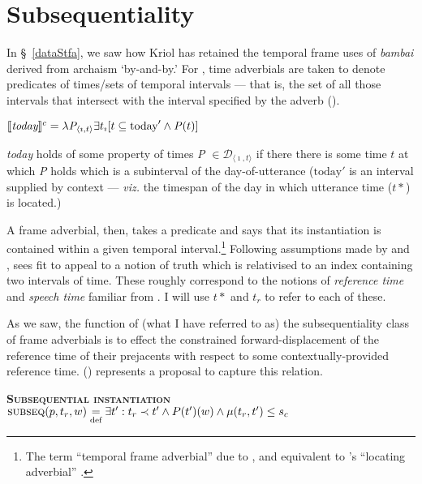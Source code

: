 	\section{Subsequentiality}\label{bambai.subseq}
	
	In §~\ref{dataStfa}, we saw how Kriol has retained the temporal frame uses of \textit{bambai} derived from archaism `by-and-by.' For \citet{Dowty1979,Dowty1982}, time adverbials are taken to denote predicates of times/sets of temporal intervals --- that is, the set of all those intervals that intersect with the interval specified by the adverb (\nextx).
	
	\pex {}
	
$ 	\denote[c]{\textit{today}}=\lambda \mathit P_{\langle\imath,t\rangle}\exists t_\imath[t\subseteq\text{today}'\wedge \mathit P(t)] $	

\textit{today} holds of some property of times \textit{P} $ \in\mathcal D_{\langle\imath,t\rangle} $ if there there is some time $ t $ at which \textit{P} holds which is a subinterval of the day-of-utterance ($ \mathrm{today}' $ is an interval supplied by context --- \textit{viz.} the timespan of the day in which utterance time ($ t* $) is located.)

	\xe
	
	 A frame adverbial, then, takes a predicate and says that its instantiation is contained within a given temporal interval.\footnote{The term ``temporal frame adverbial'' due to \citealp{Bennett}, and  equivalent to \citeauthor{Kamp1993}'s ``locating adverbial'' \citeyearpar[613]{Kamp1993}.} Following assumptions made by \citet[238\textit{ff}]{Kamp1971} and \citet[115]{Johnson1977}, \citet[29\textit{ff}]{Dowty1982} sees fit to appeal to a notion of truth which is relativised to an index containing two intervals of time. These roughly correspond to the notions of \textit{reference time} and \textit{speech time} familiar from \citet{Reichenbach1947}. I will use $ t* $ and $ t_r $ to refer to each of these.
	
	
	 As we saw, the function of (what I have referred to as) the {\sc subsequentiality} class of frame adverbials is to effect the constrained forward-displacement of the reference time of their prejacents with respect to some contextually-provided reference time. () represents a proposal to capture this relation.
	
	
	\pex {}\textbf{\textsc{Subsequential instantiation}} \\$\text{{\sc subseq}}(p,t_r,w)\underset{\text{def}}=\exists t^\prime:t_r\prec t'\wedge P(t^\prime)(w)\wedge\mu(t_r,t^\prime)\leq s_c$
	
